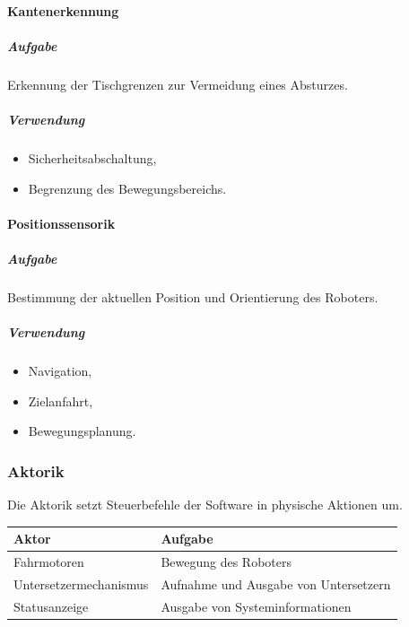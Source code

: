 \documentclass[
  a4paper,
  12pt,
  DIV=12,        %
  parskip=half,  %
  headings=small %
]{scrartcl}
\theoremstyle{definition}
\providecommand{\tightlist}{%
  \setlength{\itemsep}{0pt}\setlength{\parskip}{0pt}}
\theoremstyle{definition}
\begin{document}
\paragraph{Kantenerkennung}\label{kantenerkennung}

\subparagraph{Aufgabe}\label{aufgabe-4}

Erkennung der Tischgrenzen zur Vermeidung eines Absturzes.

\subparagraph{Verwendung}\label{verwendung-1}

\begin{itemize}
\tightlist
\item
  Sicherheitsabschaltung,
\item
  Begrenzung des Bewegungsbereichs.
\end{itemize}

\paragraph{Positionssensorik}\label{positionssensorik-1}

\subparagraph{Aufgabe}\label{aufgabe-5}

Bestimmung der aktuellen Position und Orientierung des Roboters.

\subparagraph{Verwendung}\label{verwendung-2}

\begin{itemize}
\tightlist
\item
  Navigation,
\item
  Zielanfahrt,
\item
  Bewegungsplanung.
\end{itemize}

\subsubsection{Aktorik}\label{aktorik-1}

Die Aktorik setzt Steuerbefehle der Software in physische Aktionen um.

\begin{longtable}[]{@{}ll@{}}
\toprule\noalign{}
Aktor & Aufgabe \\
\midrule\noalign{}
\endhead
\bottomrule\noalign{}
\endlastfoot
Fahrmotoren & Bewegung des Roboters \\
Untersetzermechanismus & Aufnahme und Ausgabe von Untersetzern \\
Statusanzeige & Ausgabe von Systeminformationen \\
\end{longtable}
\end{document}
